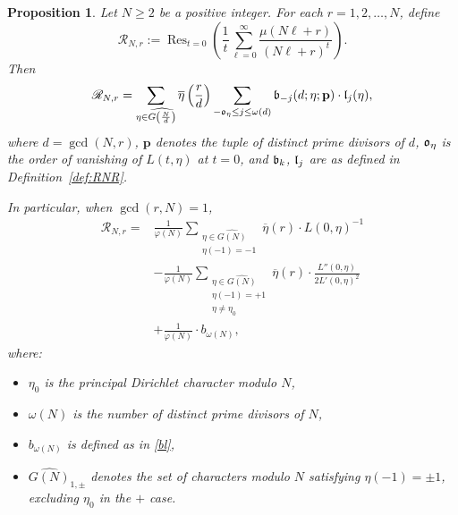 \documentclass[12pt]{amsart}
\newtheorem{proposition}[theorem]{Proposition}
\begin{document}
\begin{proposition}\label{rest}
Let $N \geq 2$ be a positive integer. For each $r = 1, 2, \dots, N$, define
\[
\mathscr{R}_{N,r} := 
\operatorname{Res}_{t=0} \left( \frac{1}{t} \sum_{\ell=0}^\infty \frac{\mu(N\ell + r)}{(N\ell + r)^t} \right).
\]
Then
\[
\mathscr{R}_{N,r} = 
\sum_{\eta \in \widehat{G\left( \frac{N}{d} \right)}} 
\overline{\eta}\left( \frac{r}{d} \right) 
\sum_{-\frak{o}_\eta \leq j \leq \omega(d)} 
\frak{b}_{-j}(d; \eta; \mathbf{p}) \cdot \frak{l}_j(\eta),
\]
where $d = \gcd(N,r)$, $\mathbf{p}$ denotes the tuple of distinct prime divisors of $d$, $\frak{o}_\eta$ is the order of vanishing of $L(t,\eta)$ at $t=0$, and $\frak{b}_k$, $\frak{l}_j$ are as defined in Definition~\ref{def:RNR}.


In particular, when $\gcd(r,N) = 1$,
\begin{equation}\label{casecoprime}
\begin{split}
\mathscr{R}_{N,r} = 
&\frac{1}{\varphi(N)} \sum_{\substack{\eta \in \widehat{G(N)} \\ \eta(-1) = -1}} \overline{\eta}(r) \cdot L(0,\eta)^{-1} \\
&- \frac{1}{\varphi(N)} \sum_{\substack{\eta \in \widehat{G(N)} \\ \eta(-1) = +1 \\ \eta \ne \eta_0}} \overline{\eta}(r) \cdot \frac{L''(0,\eta)}{2 L'(0,\eta)^2} \\
&+ \frac{1}{\varphi(N)} \cdot b_{\omega(N)},
\end{split}
\end{equation}
where:
\begin{itemize}
    \item $\eta_0$ is the principal Dirichlet character modulo $N$,
    \item $\omega(N)$ is the number of distinct prime divisors of $N$,
    \item $b_{\omega(N)}$ is defined as in \eqref{bl},
    \item $\widehat{G(N)}_{1,\pm}$ denotes the set of characters modulo $N$ satisfying $\eta(-1) = \pm 1$, excluding $\eta_0$ in the $+$ case.
\end{itemize}
\end{proposition}
\end{document}
